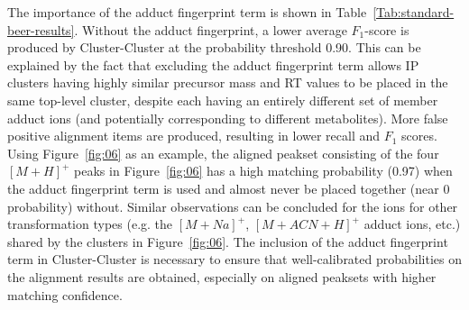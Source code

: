 The importance of the adduct fingerprint term is shown in Table~\ref{Tab:standard-beer-results}. Without the adduct fingerprint, a lower average $F_1$-score is produced by Cluster-Cluster at the probability threshold 0.90. This can be explained by the fact that excluding the adduct fingerprint term allows IP clusters having highly similar precursor mass and RT values to be placed in the same top-level cluster, despite each having an entirely different set of member adduct ions (and potentially corresponding to different metabolites). More false positive alignment items are produced, resulting in lower recall and $F_1$ scores. Using Figure~\ref{fig:06} as an example, the aligned peakset consisting of the four $[M+H]^+$ peaks in Figure~\ref{fig:06} has a high matching probability (0.97) when the adduct fingerprint term is used and almost never be placed together (near 0 probability) without. Similar observations can be concluded for the ions for other transformation types (e.g. the $[M+Na]^+$, $[M+ACN+H]^+$ adduct ions, etc.) shared by the clusters in Figure~\ref{fig:06}. The inclusion of the adduct fingerprint term in Cluster-Cluster is necessary to ensure that well-calibrated probabilities on the alignment results are obtained, especially on aligned peaksets with higher matching confidence.

